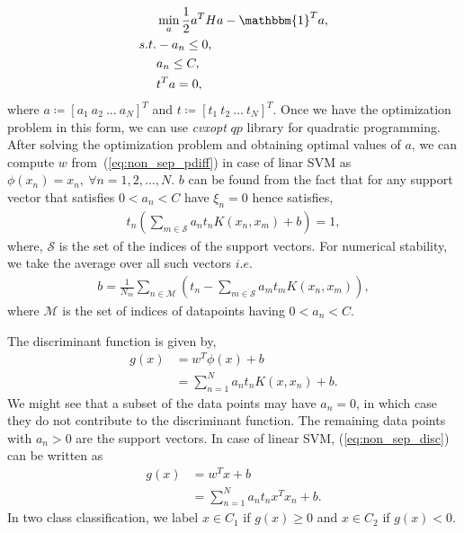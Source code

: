 \begin{align}
	&\min_a \frac{1}{2}a^THa-\mathbbm{1}^Ta, \nonumber\\
	s.t. &-a_n \leq 0, \nonumber\\
	&a_n \leq C, \nonumber\\
	& t^Ta = 0,
\end{align}
where $a \coloneqq [a_1\ a_2\ \ldots\ a_N]^T$ and $t \coloneqq [t_1\ t_2\ \ldots\ t_N]^T$.
Once we have the optimization problem in this form, we can use \textit{cvxopt} $qp$ library for quadratic programming. After solving the optimization problem and obtaining optimal values of $a$, we can compute $w$ from~(\ref{eq:non_sep_pdiff}) in case of linar SVM as $\phi(x_n) = x_n,\ \forall n = 1,2,\ldots,N$.
$b$ can be found from the fact that for any support vector that satisfies $0 < a_n < C$ have $\xi_n = 0$ hence satisfies,
\begin{align}
t_n \left(\sum_{m \in \mathcal{S}} a_n t_n K(x_n, x_m) + b\right) = 1,
\end{align}
where, $\mathcal{S}$ is the set of the indices of the support vectors. For numerical stability, we take the average over all such vectors $i.e.$
\begin{align}\label{eq:non_sep_intercept}
b = \frac{1}{N_m} \sum_{n \in \mathcal{M}} \left(t_n - \sum_{m \in \mathcal{S}}a_mt_mK(x_n, x_m)\right),
\end{align}
where $\mathcal{M}$ is the set of indices of datapoints having $0 < a_n < C$.


The discriminant function is given by,
\begin{align}\label{eq:non_sep_disc}
	g(x) &= w^T\phi(x) + b\nonumber\\
	&= \sum_{n=1}^N a_n t_n K(x, x_n) + b.
\end{align}
We might see that a subset of the data points may have $a_n=0$, in which case they do not contribute to the discriminant function. The remaining data points with $a_n > 0$ are the support vectors. In case of linear SVM, (\ref{eq:non_sep_disc}) can be written as
\begin{align}\label{eq:non_sep_disc_linear}
	g(x) &= w^Tx + b\nonumber\\
	&= \sum_{n=1}^N a_n t_n x^Tx_n + b.
\end{align}
In two class classification, we label $x \in C_1$ if $g(x) \geq 0$ and $x \in C_2$ if $g(x) < 0$.
